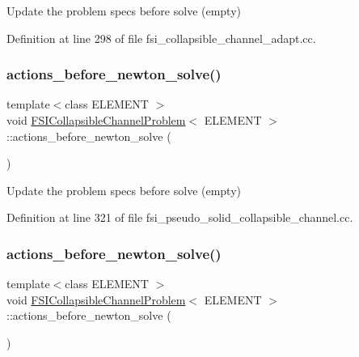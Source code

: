 Update the problem specs before solve (empty) 



Definition at line 298 of file fsi\+\_\+collapsible\+\_\+channel\+\_\+adapt.\+cc.

\mbox{\label{classFSICollapsibleChannelProblem_ad10b2d12be052c6b1bc5005dc27cd229}} 
\subsubsection{\texorpdfstring{actions\+\_\+before\+\_\+newton\+\_\+solve()}{actions\_before\_newton\_solve()}\hspace{0.1cm}{\footnotesize\ttfamily [3/4]}}
{\footnotesize\ttfamily template$<$class E\+L\+E\+M\+E\+NT $>$ \\
void \hyperlink{classFSICollapsibleChannelProblem}{F\+S\+I\+Collapsible\+Channel\+Problem}$<$ E\+L\+E\+M\+E\+NT $>$\+::actions\+\_\+before\+\_\+newton\+\_\+solve (\begin{DoxyParamCaption}{ }\end{DoxyParamCaption})\hspace{0.3cm}{\ttfamily [inline]}}



Update the problem specs before solve (empty) 



Definition at line 321 of file fsi\+\_\+pseudo\+\_\+solid\+\_\+collapsible\+\_\+channel.\+cc.

\mbox{\label{classFSICollapsibleChannelProblem_ad10b2d12be052c6b1bc5005dc27cd229}} 
\subsubsection{\texorpdfstring{actions\+\_\+before\+\_\+newton\+\_\+solve()}{actions\_before\_newton\_solve()}\hspace{0.1cm}{\footnotesize\ttfamily [4/4]}}
{\footnotesize\ttfamily template$<$class E\+L\+E\+M\+E\+NT $>$ \\
void \hyperlink{classFSICollapsibleChannelProblem}{F\+S\+I\+Collapsible\+Channel\+Problem}$<$ E\+L\+E\+M\+E\+NT $>$\+::actions\+\_\+before\+\_\+newton\+\_\+solve (\begin{DoxyParamCaption}{ }\end{DoxyParamCaption})\hspace{0.3cm}{\ttfamily [inline]}}



